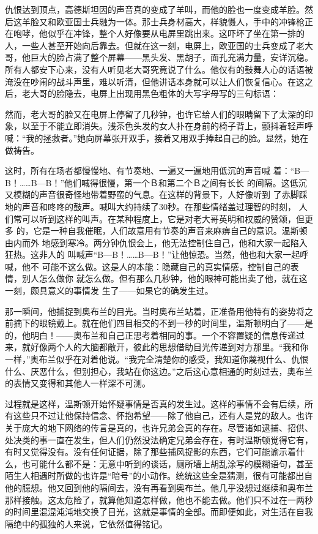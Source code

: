 仇恨达到顶点，高德斯坦因的声音真的变成了羊叫，而他的脸也一度变成羊脸。然后这羊脸又和欧亚国士兵融为一体。那士兵身材高大，样貌慑人，手中的冲锋枪正在咆哮，他似乎在冲锋，整个人好像要从电屏里跳出来。这吓坏了坐在第一排的人，一些人甚至开始向后靠去。但就在这一刻，电屏上，欧亚国的士兵变成了老大哥，他巨大的脸占满了整个屏幕——黑头发、黑胡子，面孔充满力量，安详沉稳。所有人都安下心来，没有人听见老大哥究竟说了什么。他仅有的鼓舞人心的话语被淹没在吵闹的战斗声里，难以听清，但他讲话本身就可以让人们恢复信心。在这之后，老大哥的脸隐去，电屏上出现用黑色粗体的大写字母写的三句标语：


然而，老大哥的脸又在电屏上停留了几秒钟，也许它给人们的眼睛留下了太深的印象，以至于不能立即消失。浅茶色头发的女人扑在身前的椅子背上，颤抖着轻声呼喊：``我的拯救者。''她向屏幕张开双手，接着又用双手捧起自己的脸。显然，她在做祷告。

这时，所有在场者都慢慢地、有节奏地、一遍又一遍地用低沉的声音喊
着：``B---B！\ldots\ldots B---B！''他们喊得很慢，第一个Ｂ和第二个Ｂ之间有长长
的间隔。这低沉又模糊的声音很奇怪地带着野蛮的气息。在这样的背景下，人好像听到
了赤脚踩地的声音和咚咚的鼓声。喊叫大约持续了30秒。在那些情绪盖过理智的时刻，
人们常可以听到这样的叫声。在某种程度上，它是对老大哥英明和权威的赞颂，但更多
的，它是一种自我催眠，人们故意用有节奏的声音来麻痹自己的意识。温斯顿由内而外
地感到寒冷。两分钟仇恨会上，他无法控制住自己，他和大家一起陷入狂热。这非人的
叫喊声``B---B！\ldots\ldots B---B！''让他惊恐。当然，他也和大家一起呼喊，他不
可能不这么做。这是人的本能：隐藏自己的真实情感，控制自己的表情，别人怎么做你
就怎么做。但有那么几秒钟，他的眼神可能出卖了他，就在这一刻，颇具意义的事情发
生了——如果它的确发生过。

那一瞬间，他捕捉到奥布兰的目光。当时奥布兰站着，正准备用他特有的姿势将之前摘下的眼镜戴上。就在他们四目相交的不到一秒的时间里，温斯顿明白了——是的，他明白！——奥布兰和自己正思考着相同的事。一个不容置疑的信息传递过来，就好像两个人的大脑都敞开，彼此的思想借助目光传递到对方那里。``我和你一样，''奥布兰似乎在对着他说。``我完全清楚你的感受，我知道你蔑视什么、仇恨什么、厌恶什么，但别担心，我站在你这边。''之后这心意相通的时刻过去，奥布兰的表情又变得和其他人一样深不可测。

过程就是这样，温斯顿开始怀疑事情是否真的发生过。这样的事情不会有后续，所有这些只不过让他保持信念、怀抱希望——除了他自己，还有人是党的敌人。也许关于庞大的地下网络的传言是真的，也许兄弟会真的存在。尽管诸如逮捕、招供、处决类的事一直在发生，但人们仍然没法确定兄弟会存在，有时温斯顿觉得它有，有时又觉得没有。没有任何证据，除了那些捕风捉影的东西，它们可能谕示着什么，也可能什么都不是：无意中听到的谈话，厕所墙上胡乱涂写的模糊语句，甚至陌生人相遇时所做的也许是``暗号''的小动作。统统这些全是猜测，很有可能都出自他的臆想。他又回到他的隔间去，没有再看到奥布兰。他几乎没想过继续和奥布兰那样接触。这太危险了，就算他知道怎样做，他也不能去做。他们只不过在一两秒的时间里混混沌沌地交换了目光，这就是事情的全部。而即便如此，对生活在自我隔绝中的孤独的人来说，它依然值得铭记。


